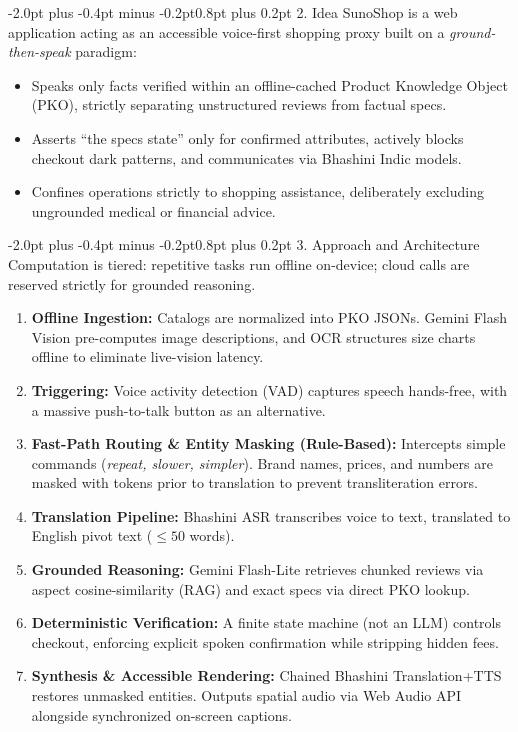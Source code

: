 \documentclass[10pt,a4paper]{article}
\makeatletter
\renewcommand{\section}{\@startsection{section}{1}{\z@}%
  {-2.0pt plus -0.4pt minus -0.2pt}{0.8pt plus 0.2pt}%
  {\normalfont\footnotesize\bfseries\scshape}}
\makeatother
\begin{document}
\vspace{-2pt}
\section{2. Idea}
SunoShop is a web application acting as an accessible voice-first shopping proxy built on a \textit{ground-then-speak} paradigm:
\begin{itemize}\setlength{\itemsep}{0.2pt}\setlength{\topsep}{0.2pt}\setlength{\leftmargin}{1.1em}
  \item Speaks only facts verified within an offline-cached Product Knowledge Object (PKO), strictly separating unstructured reviews from factual specs.
  \item Asserts ``the specs state'' only for confirmed attributes, actively blocks checkout dark patterns, and communicates via Bhashini Indic models.
  \item Confines operations strictly to shopping assistance, deliberately excluding ungrounded medical or financial advice.
\end{itemize}

\vspace{-2pt}
\section{3. Approach and Architecture}
Computation is tiered: repetitive tasks run offline on-device; cloud calls are reserved strictly for grounded reasoning.
\begin{enumerate}\setlength{\itemsep}{0.1pt}\setlength{\topsep}{0.1pt}\setlength{\parsep}{0pt}\setlength{\leftmargin}{1.1em}
  \item \textbf{Offline Ingestion:} Catalogs are normalized into PKO JSONs. Gemini Flash Vision pre-computes image descriptions, and OCR structures size charts offline to eliminate live-vision latency.
  \item \textbf{Triggering:} Voice activity detection (VAD) captures speech hands-free, with a massive push-to-talk button as an alternative.
  \item \textbf{Fast-Path Routing \& Entity Masking (Rule-Based):} Intercepts simple commands (\textit{repeat, slower, simpler}). Brand names, prices, and numbers are masked with tokens prior to translation to prevent transliteration errors.
  \item \textbf{Translation Pipeline:} Bhashini ASR transcribes voice to text, translated to English pivot text ($\le 50$ words).
  \item \textbf{Grounded Reasoning:} Gemini Flash-Lite retrieves chunked reviews via aspect cosine-similarity (RAG) and exact specs via direct PKO lookup.
  \item \textbf{Deterministic Verification:} A finite state machine (not an LLM) controls checkout, enforcing explicit spoken confirmation while stripping hidden fees.
  \item \textbf{Synthesis \& Accessible Rendering:} Chained Bhashini Translation+TTS restores unmasked entities. Outputs spatial audio via Web Audio API alongside synchronized on-screen captions.
\end{enumerate}
\end{document}
